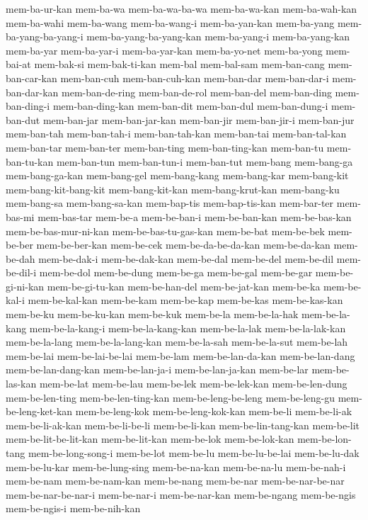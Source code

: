 {mem-ba-ur-kan mem-ba-wa mem-ba-wa-ba-wa mem-ba-wa-kan mem-ba-wah-kan
mem-ba-wahi mem-ba-wang mem-ba-wang-i mem-ba-yan-kan mem-ba-yang
mem-ba-yang-ba-yang-i mem-ba-yang-ba-yang-kan mem-ba-yang-i
mem-ba-yang-kan mem-ba-yar mem-ba-yar-i mem-ba-yar-kan mem-ba-yo-net
mem-ba-yong mem-bai-at mem-bak-si mem-bak-ti-kan mem-bal mem-bal-sam
mem-ban-cang mem-ban-car-kan mem-ban-cuh mem-ban-cuh-kan mem-ban-dar
mem-ban-dar-i mem-ban-dar-kan mem-ban-de-ring mem-ban-de-rol mem-ban-del
mem-ban-ding mem-ban-ding-i mem-ban-ding-kan mem-ban-dit mem-ban-dul
mem-ban-dung-i mem-ban-dut mem-ban-jar mem-ban-jar-kan mem-ban-jir
mem-ban-jir-i mem-ban-jur mem-ban-tah mem-ban-tah-i mem-ban-tah-kan
mem-ban-tai mem-ban-tal-kan mem-ban-tar mem-ban-ter mem-ban-ting
mem-ban-ting-kan mem-ban-tu mem-ban-tu-kan mem-ban-tun mem-ban-tun-i
mem-ban-tut mem-bang mem-bang-ga mem-bang-ga-kan mem-bang-gel
mem-bang-kang mem-bang-kar mem-bang-kit mem-bang-kit-bang-kit
mem-bang-kit-kan mem-bang-krut-kan mem-bang-ku mem-bang-sa mem-bang-sa-kan
mem-bap-tis mem-bap-tis-kan mem-bar-ter mem-bas-mi mem-bas-tar mem-be-a
mem-be-ban-i mem-be-ban-kan mem-be-bas-kan mem-be-bas-mur-ni-kan
mem-be-bas-tu-gas-kan mem-be-bat mem-be-bek mem-be-ber mem-be-ber-kan
mem-be-cek mem-be-da-be-da-kan mem-be-da-kan mem-be-dah mem-be-dak-i
mem-be-dak-kan mem-be-dal mem-be-del mem-be-dil mem-be-dil-i mem-be-dol
mem-be-dung mem-be-ga mem-be-gal mem-be-gar mem-be-gi-ni-kan
mem-be-gi-tu-kan mem-be-han-del mem-be-jat-kan mem-be-ka mem-be-kal-i
mem-be-kal-kan mem-be-kam mem-be-kap mem-be-kas mem-be-kas-kan mem-be-ku
mem-be-ku-kan mem-be-kuk mem-be-la mem-be-la-hak mem-be-la-kang
mem-be-la-kang-i mem-be-la-kang-kan mem-be-la-lak mem-be-la-lak-kan
mem-be-la-lang mem-be-la-lang-kan mem-be-la-sah mem-be-la-sut mem-be-lah
mem-be-lai mem-be-lai-be-lai mem-be-lam mem-be-lan-da-kan mem-be-lan-dang
mem-be-lan-dang-kan mem-be-lan-ja-i mem-be-lan-ja-kan mem-be-lar
mem-be-las-kan mem-be-lat mem-be-lau mem-be-lek mem-be-lek-kan
mem-be-len-dung mem-be-len-ting mem-be-len-ting-kan mem-be-leng-be-leng
mem-be-leng-gu mem-be-leng-ket-kan mem-be-leng-kok mem-be-leng-kok-kan
mem-be-li mem-be-li-ak mem-be-li-ak-kan mem-be-li-be-li mem-be-li-kan
mem-be-lin-tang-kan mem-be-lit mem-be-lit-be-lit-kan mem-be-lit-kan
mem-be-lok mem-be-lok-kan mem-be-lon-tang mem-be-long-song-i mem-be-lot
mem-be-lu mem-be-lu-be-lai mem-be-lu-dak mem-be-lu-kar mem-be-lung-sing
mem-be-na-kan mem-be-na-lu mem-be-nah-i mem-be-nam mem-be-nam-kan
mem-be-nang mem-be-nar mem-be-nar-be-nar mem-be-nar-be-nar-i mem-be-nar-i
mem-be-nar-kan mem-be-ngang mem-be-ngis mem-be-ngis-i mem-be-nih-kan
}
